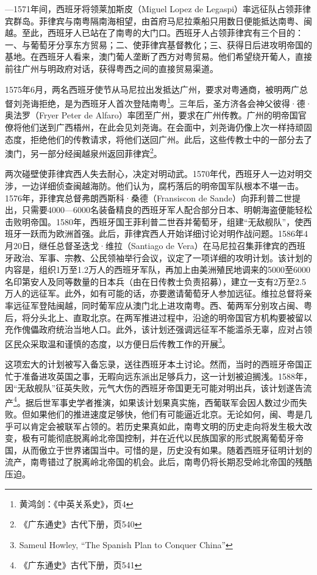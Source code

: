 —1571年间，西班牙将领莱加斯皮（Miguel Lopez de Legaspi）率远征队占领菲律宾群岛。菲律宾与南粤隔南海相望，由首府马尼拉乘船只用数日便能抵达南粤、闽越。至此，西班牙人已站在了南粤的大门口。西班牙人占领菲律宾有三个目的：一、与葡萄牙分享东方贸易；二、使菲律宾基督教化；三、获得日后进攻明帝国的基地。在西班牙人看来，澳门葡人垄断了西方对粤贸易。他们希望绕开葡人，直接前往广州与明政府对话，获得粤西之间的直接贸易渠道。

1575年6月，两名西班牙使节从马尼拉出发抵达广州，要求对粤通商，被明两广总督刘尧诲拒绝，是为西班牙人首次登陆南粤\footnote{黄鸿剑：《中英关系史》，页4}。三年后，圣方济各会神父彼得·德·奥法罗（Fryer Peter de Alfaro）率团至广州，要求在广州传教。广州的明帝国官僚将他们送到广西梧州，在此会见刘尧诲。在会面中，刘尧诲仍像上次一样持顽固态度，拒绝他们的传教请求，将他们送回广州。此后，这些传教士中的一部分去了澳门，另一部分经闽越泉州返回菲律宾\footnote{《广东通史》古代下册，页540}。

两次碰壁使菲律宾西人失去耐心，决定对明动武。1570年代，西班牙人一边对明交涉，一边详细侦查闽越海防。他们认为，腐朽落后的明帝国军队根本不堪一击。1576年，菲律宾总督弗朗西斯科·桑德（Fransiscon de Sande）向菲利普二世提出，只需要4000—6000名装备精良的西班牙军人配合部分日本、明朝海盗便能轻松击败明帝国。1580年，西班牙国王菲利普二世吞并葡萄牙，组建“无敌舰队”，使西班牙一跃而为欧洲首强。此后，菲律宾西人开始详细讨论对明作战问题。1586年4月20日，继任总督圣迭戈·维拉（Santiago de Vera）在马尼拉召集菲律宾的西班牙政治、军事、宗教、公民领袖举行会议，议定了一项详细的攻明计划。该计划的内容是，组织1万至1.2万人的西班牙军队，再加上由美洲殖民地调来的5000至6000名印第安人及同等数量的日本兵（由在日传教士负责招募），建立一支有2万至2.5万人的远征军。此外，如有可能的话，亦要邀请葡萄牙人参加远征。维拉总督将亲率远征军登陆闽越，同时葡军应从澳门北上进攻南粤。西、葡两军分别攻占闽、粤后，将分头北上、直取北京。在两军推进过程中，沿途的明帝国官方机构要被留以充作傀儡政府统治当地人口。此外，该计划还强调远征军不能滥杀无辜，应对占领区民众采取温和谨慎的态度，以方便日后传教工作的开展\footnote{Sameul Howley, “The Spanish Plan to Conquer China”}。

这项宏大的计划被写入备忘录，送往西班牙本土讨论。然而，当时的西班牙帝国正忙于准备进攻英国之事，无暇向远东派出足够兵力，这一计划被迫搁浅。1588年，因“无敌舰队”征英失败，元气大伤的西班牙帝国更无可能对明出兵，该计划遂告流产\footnote{《广东通史》古代下册，页541}。据后世军事史学者推演，如果该计划果真实施，西葡联军会因人数过少而失败。但如果他们的推进速度足够快，他们有可能逼近北京。无论如何，闽、粤是几乎可以肯定会被联军占领的。若历史果真如此，南粤文明的历史走向将发生极大改变，极有可能彻底脱离岭北帝国控制，并在近代以民族国家的形式脱离葡萄牙帝国，从而傲立于世界诸国当中。可惜的是，历史没有如果。随着西班牙征明计划的流产，南粤错过了脱离岭北帝国的机会。此后，南粤仍将长期忍受岭北帝国的残酷压迫。

